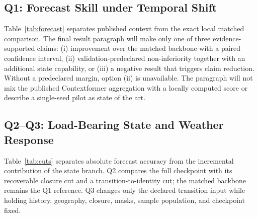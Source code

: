 \documentclass[letterpaper]{article} %
\begin{document}
\subsection{Q1: Forecast Skill under Temporal Shift}

Table~\ref{tab:forecast} separates published context from the exact local
matched comparison. The
final result paragraph will make only one of three evidence-supported claims:
(i) improvement over the matched backbone with a paired confidence interval,
(ii) validation-predeclared non-inferiority together with an additional state
capability, or (iii) a negative result that triggers claim reduction. Without a
predeclared margin, option (ii) is unavailable. The paragraph will not mix the
published Contextformer aggregation with a locally computed score or describe
a single-seed pilot as state of the art.


\subsection{Q2--Q3: Load-Bearing State and Weather Response}

Table~\ref{tab:cuts} separates absolute forecast accuracy from the incremental
contribution of the state branch. Q2 compares the full checkpoint with its
recoverable closure cut and a transition-to-identity cut; the matched backbone
remains the Q1 reference. Q3 changes only the declared transition input while
holding history, geography, closure, masks, sample population, and checkpoint
fixed.
\end{document}
